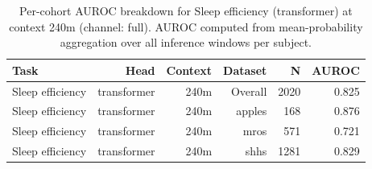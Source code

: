 \begin{table}[ht]
\centering
\caption{Per-cohort AUROC breakdown for Sleep efficiency (transformer) at context 240m (channel: full). AUROC computed from mean-probability aggregation over all inference windows per subject.}
\label{tab:cohort_sleep_efficiency_binary_transformer_full}
\begin{tabular}{lrrrrr}
\toprule
Task & Head & Context & Dataset & N & AUROC \\
\midrule
Sleep efficiency & transformer & 240m & Overall & 2020 & 0.825 \\
Sleep efficiency & transformer & 240m & apples & 168 & 0.876 \\
Sleep efficiency & transformer & 240m & mros & 571 & 0.721 \\
Sleep efficiency & transformer & 240m & shhs & 1281 & 0.829 \\
\bottomrule
\end{tabular}
\end{table}
